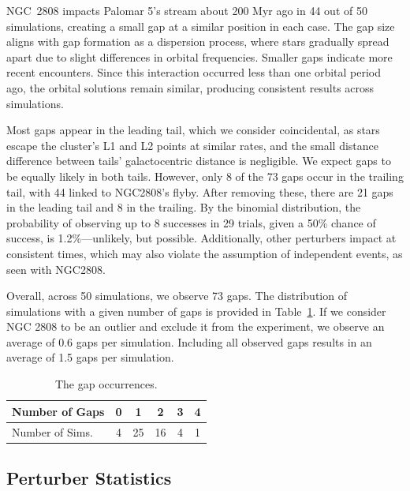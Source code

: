 \documentclass{aa}
\begin{document}
    NGC~2808 impacts Palomar 5's stream about 200 Myr ago in 44 out of 50 simulations, creating a small gap at a similar position in each case. The gap size aligns with gap formation as a dispersion process, where stars gradually spread apart due to slight differences in orbital frequencies. Smaller gaps indicate more recent encounters. Since this interaction occurred less than one orbital period ago, the orbital solutions remain similar, producing consistent results across simulations.


    Most gaps appear in the leading tail, which we consider coincidental, as stars escape the cluster's L1 and L2 points at similar rates, and the small distance difference between tails' galactocentric distance is negligible. We expect gaps to be equally likely in both tails. However, only 8 of the 73 gaps occur in the trailing tail, with 44 linked to NGC2808's flyby. After removing these, there are 21 gaps in the leading tail and 8 in the trailing. By the binomial distribution, the probability of observing up to 8 successes in 29 trials, given a 50\% chance of success, is 1.2\%—unlikely, but possible. Additionally, other perturbers impact at consistent times, which may also violate the assumption of independent events, as seen with NGC2808.




    Overall, across 50 simulations, we observe 73 gaps. The distribution of simulations with a given number of gaps is provided in Table~\ref{table:gap_distribution}.  If we consider NGC 2808 to be an outlier and exclude it from the experiment, we observe an average of 0.6 gaps per simulation. Including all observed gaps results in an average of 1.5 gaps per simulation.

    \begin{table}[h]
      \centering
        \begin{tabular}{|l|c|c|c|c|c|}
          \hline
          Number of Gaps & 0 & 1 & 2 & 3 & 4 \\
          \hline
          Number of Sims. & 4 & 25 & 16 & 4 & 1 \\
          \hline
        \end{tabular}
      \caption{The gap occurrences.}\label{table:gap_distribution}
    \end{table}
    


    

    



 
 \subsection*{Perturber Statistics}
  
\end{document}
